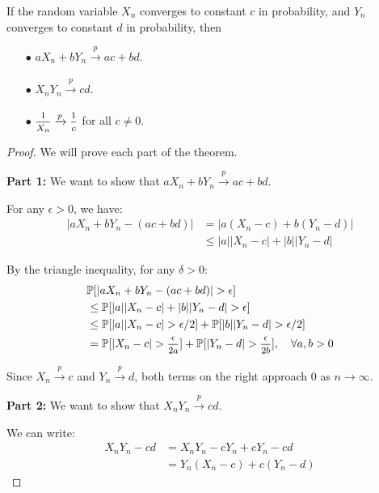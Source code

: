 \begin{theorem}
    If the random variable $X_n$ converges to constant $c$ in probability, and 
    $Y_n$ converges to constant $d$ in probability, then 
    \begin{itemize}
        \item[$\bullet$] $aX_n + bY_n \xrightarrow[]{p} ac + bd$.
        \item[$\bullet$] $X_n Y_n \xrightarrow[]{p} cd$.
        \item[$\bullet$] $\mfrac{1}{X_n} \xrightarrow[]{p} \mfrac{1}{c}$ for all $c \neq 0$.
    \end{itemize}
\end{theorem}

\begin{proof}
    We will prove each part of the theorem.
    
    \textbf{Part 1:} We want to show that $aX_n + bY_n \xrightarrow{p} ac + bd$.
    
    For any $\epsilon > 0$, we have:
    \begin{align*}
        |aX_n + bY_n - (ac + bd)| &= |a(X_n - c) + b(Y_n - d)| \\
        &\leq |a||X_n - c| + |b||Y_n - d|
    \end{align*}
    
    By the triangle inequality, for any $\delta > 0$:
    \begin{align*}
        &\mathbb{P}[|aX_n + bY_n - (ac + bd)| > \epsilon] \\
        &\leq \mathbb{P}[|a||X_n - c| + |b||Y_n - d| > \epsilon] \\
        &\leq \mathbb{P}[|a||X_n - c| > \epsilon/2] + \mathbb{P}[|b||Y_n - d| > \epsilon/2] \\
        &= \mathbb{P}[|X_n - c| > \mfrac{\epsilon}{2a}] + \mathbb{P}[|Y_n - d| > \mfrac{\epsilon}{2b}], \quad \forall a, b > 0
    \end{align*}
    
    Since $X_n \xrightarrow{p} c$ and $Y_n \xrightarrow{p} d$, both terms on the right approach 0 as $n \to \infty$.
    
    \textbf{Part 2:} We want to show that $X_n Y_n \xrightarrow{p} cd$.
    
    We can write:
    \begin{align*}
        X_n Y_n - cd &= X_n Y_n - cY_n + cY_n - cd \\
        &= Y_n(X_n - c) + c(Y_n - d)
    \end{align*}
    

\end{proof}
